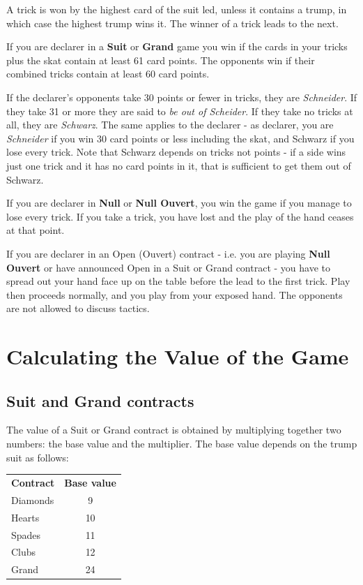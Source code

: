 \documentclass[letter]{article}
\begin{document}
  A trick is won by the highest card of the suit led, unless it contains a
  trump, in which case the highest trump wins it. The winner of a trick leads
  to the next.

  If you are declarer in a {\bfseries Suit} or {\bfseries Grand} game you win if
  the cards in your tricks plus the skat contain at least 61 card points. The
  opponents win if their combined tricks contain at least 60 card points.

  If the declarer's opponents take 30 points or fewer in tricks, they are
  \emph{Schneider}. If they take 31 or more they are said to \emph{be out of
  Scheider}. If they take no tricks at all, they are \emph{Schwarz}. The same
  applies to the declarer - as declarer, you are \emph{Schneider} if you win 30
  card points or less including the skat, and Schwarz if you lose every trick.
  Note that Schwarz depends on tricks not points - if a side wins just one trick
  and it has no card points in it, that is sufficient to get them out of
  Schwarz.

  If you are declarer in {\bfseries Null} or {\bfseries Null Ouvert}, you win the
  game if you manage to lose every trick. If you take a trick, you have lost and
  the play of the hand ceases at that point.

  If you are declarer in an Open (Ouvert) contract - i.e. you are playing
  {\bfseries Null Ouvert} or have announced Open in a Suit or Grand contract -
  you have to spread out your hand face up on the table before the lead to the
  first trick. Play then proceeds normally, and you play from your exposed hand.
  The opponents are not allowed to discuss tactics.

  \section*{Calculating the Value of the Game}

  \subsection*{Suit and Grand contracts}

  The value of a Suit or Grand contract is obtained by multiplying together two
  numbers: the base value and the multiplier. The base value depends on the
  trump suit as follows:

  \begin{tabular}{l c}
    {\bfseries Contract} & {\bfseries Base value} \\
    Diamonds &  9 \\
    Hearts   & 10 \\
    Spades   & 11 \\
    Clubs    & 12 \\
    Grand    & 24 \\
  \end{tabular}
\end{document}

